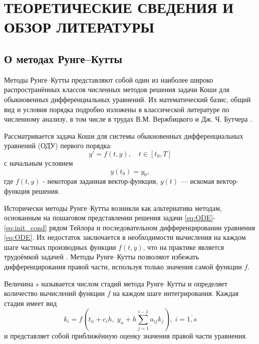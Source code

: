 \newpage
\pagestyle{plain}

\section{\centering ТЕОРЕТИЧЕСКИЕ СВЕДЕНИЯ И ОБЗОР ЛИТЕРАТУРЫ}
\label{sec:literature_and_theory}

\subsection{О методах Рунге--Кутты}
\label{subsec:about_RK}
Методы Рунге--Кутты представляют собой один из наиболее широко распространённых классов численных методов решения задачи Коши для обыкновенных дифференциальных уравнений. Их математический базис, общий вид и условия порядка подробно изложены в классической литературе по численному анализу, в том числе в трудах В.М. Вержбицкого \cite{Verzhbitsky2002} и Дж. Ч. Бутчера \cite{Butcher2008}.

Рассматривается задача Коши для системы обыкновенных дифференциальных уравнений (ОДУ) первого порядка:
\begin{equation} \label{eq:ODE}
	y' = f(t, y), \quad t \in [t_0, T]
\end{equation}
с начальным условием 
\begin{equation} \label{eq:init_cond}
	y(t_0) = y_0,
\end{equation}
где $f(t, y)$ - некоторая заданная вектор-функция, $y(t)$ — искомая вектор-функция решения.

Исторически методы Рунге--Кутты возникли как альтернатива методам, основанным на пошаговом представлении решения задачи \eqref{eq:ODE}-\eqref{eq:init_cond} рядом Тейлора и последовательном дифференцировании уравнения \eqref{eq:ODE}. Их недостаток заключается в необходимости вычисления на каждом шаге частных производных функции $f(t, y)$, что на практике является трудоёмкой задачей \cite{Verzhbitsky2002}. Методы Рунге--Кутты позволяют избежать дифференцирования правой части, используя только значения самой функции $f$.

Величина $s$ называется числом стадий метода Рунге–Кутты и определяет количество вычислений функции $f$ на каждом шаге интегрирования. Каждая стадия имеет вид
\begin{equation*}
	k_i = f\left(t_n + c_i h,\; y_n + h \sum_{j=1}^{i-1} a_{ij} k_j \right), \; i = \overline{1, s}
\end{equation*}
и представляет собой приближённую оценку значения правой части уравнения.

